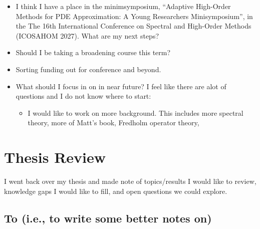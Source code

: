 \documentclass[12pt,a4paper]{article}
\begin{document}
\begin{itemize}
    \item I think I have a place in the minimsymposium, “Adaptive High-Order Methods for PDE Approximation: A Young Researchers Minisymposium”, in the The 16th International Conference on Spectral and High-Order Methods (ICOSAHOM 2027). What are my next steps?
    \item Should I be taking a broadening course this term?
    \item Sorting funding out for conference and beyond. 
    \item What should I focus in on in near future? I feel like there are alot of questions and I do not know where to start:
    \begin{itemize}
        \item I would like to work on more background. This includes more spectral theory, more of Matt's book, Fredholm operator theory, 
    \end{itemize}
\end{itemize}




\section{Thesis Review}

I went back over my thesis and made note of topics/results I would like to review, knowledge gaps I would like to fill, and open questions we could explore. 

\subsection{To  (i.e., to write some better notes on)}
\end{document}
